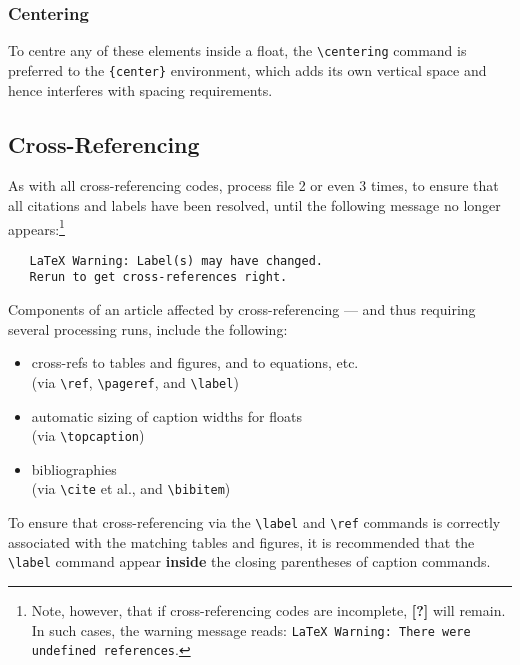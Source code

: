 \subsubsection{Centering}

To centre any of these elements inside a float, the \verb|\centering|
command is preferred to the \verb|{center}| environment, which adds
its own vertical space and hence interferes with \NRC{} spacing
requirements.


\subsection{Cross-Referencing}

As with all cross-referencing codes, process file 2 or even 3 times,
to ensure that all citations and labels have been resolved, until the
following message no longer appears:\footnote{Note, however, that if
cross-referencing codes are incomplete, \textbf{[?]} will remain. In
such cases, the warning message reads: \texttt{LaTeX Warning: There
were undefined references}.}

\begin{verbatim}
   LaTeX Warning: Label(s) may have changed. 
   Rerun to get cross-references right. 
\end{verbatim}

\noindent Components of an article affected by cross-referencing ---
and thus requiring several processing runs, include the following:

\begin{itemize} \itemsep=0pt
   \item cross-refs to tables and figures, and to equations, etc. \\
         (via \verb|\ref|, \verb|\pageref|, and \verb|\label|)

   \item automatic sizing of caption widths for floats \\
         (via \verb|\topcaption|)

   \item bibliographies \\
         (via \verb|\cite| et al., and \verb|\bibitem|)
\end{itemize}

To ensure that cross-referencing via the \verb|\label| and \verb|\ref|
commands is correctly associated with the matching tables and figures,
it is recommended that the \verb|\label| command appear
\textbf{inside} the closing parentheses of caption commands.


